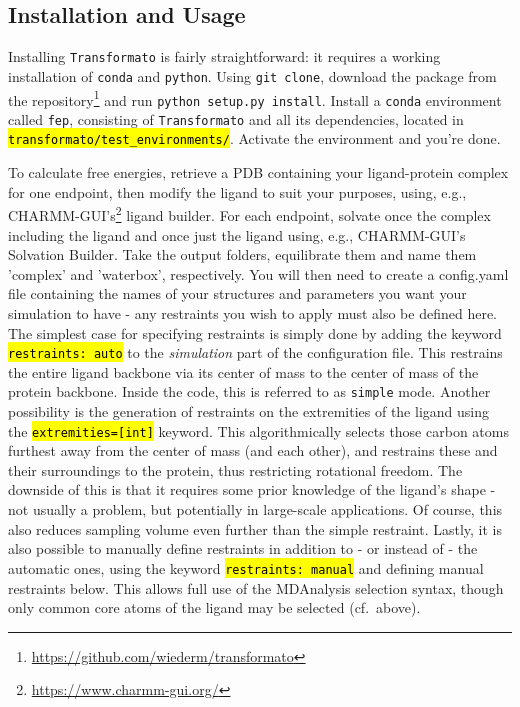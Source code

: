 \documentclass[oneside]{scrreprt}
\newcommand{\code}[1]{\texttt{\hl{#1}}}
\begin{document}
\subsection{Installation and Usage}\label{sec:installation}
Installing \texttt{Transformato} is fairly straightforward: it requires a working installation of \texttt{conda} and \texttt{python}. Using \texttt{git clone}, download the package from the repository\footnote{\url{https://github.com/wiederm/transformato}} and run \texttt{python setup.py install}. Install a \texttt{conda} environment called \texttt{fep}, consisting of \texttt{Transformato} and all its dependencies, located in \code{transformato/test\_environments/}. Activate the environment and you're done.

To calculate free energies, retrieve a PDB containing your ligand-protein complex for one endpoint, then modify the ligand to suit your purposes, using, e.g., CHARMM-GUI's\footnote{\url{https://www.charmm-gui.org/}} \cite{Jo2008Aug,Guterres2021Nov,Gao2021Feb} ligand builder. For each endpoint, solvate once the complex including the ligand and once just the ligand using, e.g., CHARMM-GUI's Solvation Builder. Take the output folders, equilibrate them and name them 'complex' and 'waterbox', respectively. You will then need to create a config.yaml file containing the names of your structures and parameters you want your simulation to have - any restraints you wish to apply must also be defined here. The simplest case for specifying restraints is simply done by adding the keyword \code{restraints: auto} to the \emph{simulation} part of the configuration file. This restrains the entire ligand backbone via its center of mass to the center of mass of the protein backbone. Inside the code, this is referred to as \texttt{simple} mode. Another possibility is the generation of restraints on the extremities of the ligand using the \code{extremities=[int]} keyword. This algorithmically selects those carbon atoms furthest away from the center of mass (and each other), and restrains these and their surroundings to the protein, thus restricting rotational freedom. The downside of this is that it requires some prior knowledge of the ligand's shape - not usually a problem, but potentially in large-scale applications. Of course, this also reduces sampling volume even further than the simple restraint. Lastly, it is also possible to manually define restraints in addition to - or instead of - the automatic ones, using the keyword \code{restraints: manual} and defining manual restraints below. This allows full use of the MDAnalysis\cite{agrawal2011,oliver_beckstein-proc-scipy-2016} selection syntax, though only common core atoms of the ligand may be selected (cf.\ above).
\end{document}
